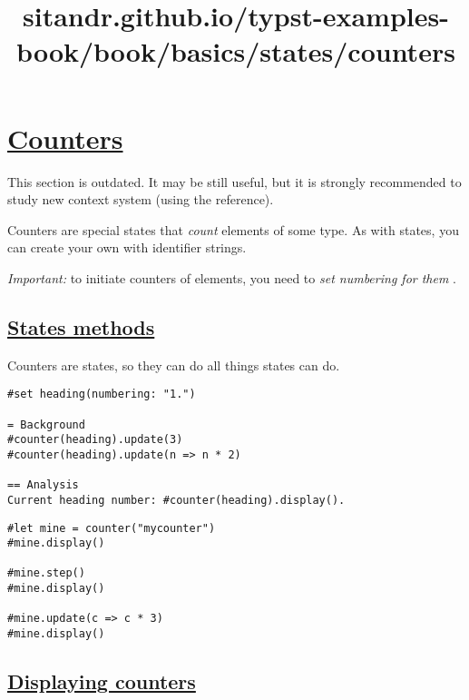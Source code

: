\title{sitandr.github.io/typst-examples-book/book/basics/states/counters}

\section{\texorpdfstring{\hyperref[counters]{Counters}}{Counters}}\label{counters}

This section is outdated. It may be still useful, but it is strongly
recommended to study new context system (using the reference).

Counters are special states that \emph{count} elements of some type. As
with states, you can create your own with identifier strings.

\emph{Important:} to initiate counters of elements, you need to
\emph{set numbering for them} .

\subsection{\texorpdfstring{\hyperref[states-methods]{States
methods}}{States methods}}\label{states-methods}

Counters are states, so they can do all things states can do.

\begin{verbatim}
#set heading(numbering: "1.")

= Background
#counter(heading).update(3)
#counter(heading).update(n => n * 2)

== Analysis
Current heading number: #counter(heading).display().
\end{verbatim}

\pandocbounded{}

\begin{verbatim}
#let mine = counter("mycounter")
#mine.display()

#mine.step()
#mine.display()

#mine.update(c => c * 3)
#mine.display()
\end{verbatim}

\pandocbounded{}

\subsection{\texorpdfstring{\hyperref[displaying-counters]{Displaying
counters}}{Displaying counters}}\label{displaying-counters}

